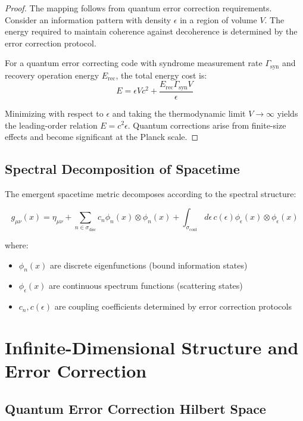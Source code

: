 \documentclass[12pt]{article}
\begin{document}
\begin{proof}
The mapping follows from quantum error correction requirements. Consider an information pattern with density $\epsilon$ in a region of volume $V$. The energy required to maintain coherence against decoherence is determined by the error correction protocol.

For a quantum error correcting code with syndrome measurement rate $\Gamma_{\text{syn}}$ and recovery operation energy $E_{\text{rec}}$, the total energy cost is:
\begin{equation}
E = \epsilon V c^2 + \frac{E_{\text{rec}} \Gamma_{\text{syn}} V}{\epsilon}
\end{equation}

Minimizing with respect to $\epsilon$ and taking the thermodynamic limit $V \to \infty$ yields the leading-order relation $E = c^2 \epsilon$. Quantum corrections arise from finite-size effects and become significant at the Planck scale.
\end{proof}

\subsection{Spectral Decomposition of Spacetime}

The emergent spacetime metric decomposes according to the spectral structure:

\begin{equation}
g_{\mu\nu}(x) = \eta_{\mu\nu} + \sum_{n \in \sigma_{\text{disc}}} c_n \phi_n(x) \otimes \phi_n(x) + \int_{\sigma_{\text{cont}}} d\epsilon \, c(\epsilon) \phi_\epsilon(x) \otimes \phi_\epsilon(x)
\end{equation}

where:
\begin{itemize}
\item $\phi_n(x)$ are discrete eigenfunctions (bound information states)
\item $\phi_\epsilon(x)$ are continuous spectrum functions (scattering states)
\item $c_n, c(\epsilon)$ are coupling coefficients determined by error correction protocols
\end{itemize}

\section{Infinite-Dimensional Structure and Error Correction}

\subsection{Quantum Error Correction Hilbert Space}
\end{document}
